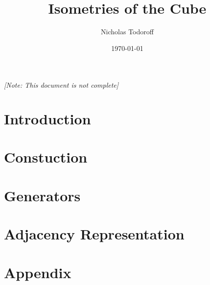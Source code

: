 \documentclass[12pt]{article}
\title{Isometries of the Cube}
\author{Nicholas Todoroff}
\date\today
\numberwithin{section}{part}
\numberwithin{equation}{section}
\begin{document}
\maketitle

\vspace{-5mm}
{\centering\emph{[Note: This document is not complete]}\par}
\vspace{-5mm}
\part*{Introduction}
                           
\part{Constuction}
  \label{part:construction}
\part{Generators}
  \label{part:generators}  
\part{Adjacency Representation}
  \label{part:adjrep}      

\newpage
\part*{Appendix}
                           
\end{document}
